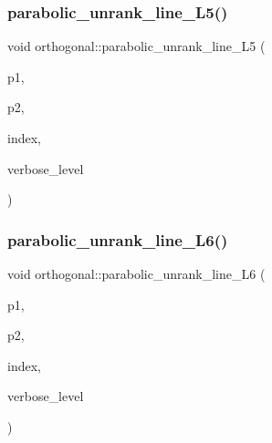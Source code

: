 \subsubsection{\texorpdfstring{parabolic\+\_\+unrank\+\_\+line\+\_\+\+L5()}{parabolic\_unrank\_line\_L5()}}
{\footnotesize\ttfamily void orthogonal\+::parabolic\+\_\+unrank\+\_\+line\+\_\+\+L5 (\begin{DoxyParamCaption}\item[{\mbox{\hyperlink{galois_8h_a09fddde158a3a20bd2dcadb609de11dc}{I\+NT}} \&}]{p1,  }\item[{\mbox{\hyperlink{galois_8h_a09fddde158a3a20bd2dcadb609de11dc}{I\+NT}} \&}]{p2,  }\item[{\mbox{\hyperlink{galois_8h_a09fddde158a3a20bd2dcadb609de11dc}{I\+NT}}}]{index,  }\item[{\mbox{\hyperlink{galois_8h_a09fddde158a3a20bd2dcadb609de11dc}{I\+NT}}}]{verbose\+\_\+level }\end{DoxyParamCaption})}

\mbox{\label{classorthogonal_a3fecd8b43b3e09d6b35e550850b11d56}} 
\subsubsection{\texorpdfstring{parabolic\+\_\+unrank\+\_\+line\+\_\+\+L6()}{parabolic\_unrank\_line\_L6()}}
{\footnotesize\ttfamily void orthogonal\+::parabolic\+\_\+unrank\+\_\+line\+\_\+\+L6 (\begin{DoxyParamCaption}\item[{\mbox{\hyperlink{galois_8h_a09fddde158a3a20bd2dcadb609de11dc}{I\+NT}} \&}]{p1,  }\item[{\mbox{\hyperlink{galois_8h_a09fddde158a3a20bd2dcadb609de11dc}{I\+NT}} \&}]{p2,  }\item[{\mbox{\hyperlink{galois_8h_a09fddde158a3a20bd2dcadb609de11dc}{I\+NT}}}]{index,  }\item[{\mbox{\hyperlink{galois_8h_a09fddde158a3a20bd2dcadb609de11dc}{I\+NT}}}]{verbose\+\_\+level }\end{DoxyParamCaption})}

\mbox{\label{classorthogonal_af37feffb93b694bd8b9f5ff5f8bdd4eb}} 
